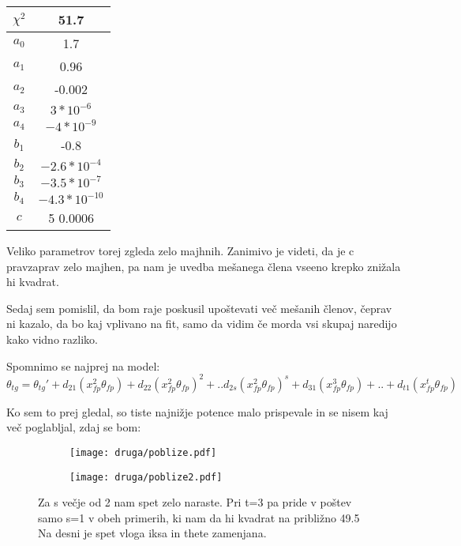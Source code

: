 \documentclass{article}
\begin{document}
\begin{center}
\begin{tabular}{|c|c|}
\hline
$\chi^2$ & 51.7 \\ \hline
$a_0$ & 1.7 \\ \hline
$a_1$ & 0.96 \\ \hline
$a_2$ & -0.002 \\ \hline
$a_3$ & $3*10^{-6}$ \\ \hline
$a_4$ & $-4*10^{-9}$ \\ \hline
$b_1$ & -0.8 \\ \hline
$b_2$ & $-2.6*10^{-4}$ \\ \hline
$b_3$ & $-3.5*10^{-7}$ \\ \hline
$b_4$ & $-4.3*10^{-10}$ \\ \hline
$c$ & 5 $0.0006$\\ \hline
\end{tabular}
\end{center}
Veliko parametrov torej zgleda zelo majhnih. Zanimivo je videti, da je c pravzaprav zelo majhen, pa nam je uvedba mešanega člena vseeno krepko znižala hi kvadrat.


Sedaj sem pomislil, da bom raje poskusil upoštevati več mešanih členov, čeprav ni kazalo, da bo kaj vplivano na fit, samo da vidim če morda vsi skupaj naredijo kako vidno razliko. 

Spomnimo se najprej na model:
\begin{equation*}
\theta_{tg} = \theta_{tg}' + d_{21}(x_{fp}^2 \theta_{fp}) + d_{22} (x_{fp}^2 \theta_{fp})^2 + .. d_{2s}(x_{fp}^2 \theta_{fp})^s + d_{31}(x_{fp}^3 \theta_{fp}) + .. + d_{t1}(x_{fp}^t \theta_{fp})
\end{equation*}

Ko sem to prej gledal, so tiste najnižje potence malo prispevale in se nisem kaj več poglabljal, zdaj se bom:

\begin{figure}[H]
\begin{subfigure}{.49\textwidth}
\texttt{[image: druga/poblize.pdf]}
\end{subfigure}
\begin{subfigure}{.49\textwidth}
\texttt{[image: druga/poblize2.pdf]}
\end{subfigure}
\caption*{Za s večje od 2 nam spet zelo naraste. Pri t=3 pa pride v poštev samo s=1 v obeh primerih, ki nam da hi kvadrat na približno 49.5 Na desni je spet vloga iksa in thete zamenjana.}
\end{figure}
\end{document}

